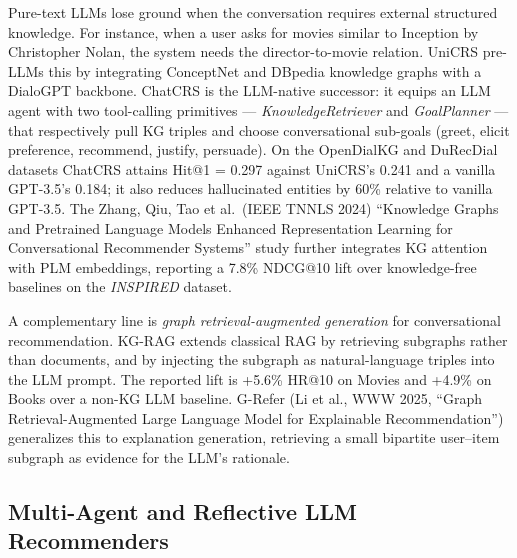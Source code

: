 \documentclass{article}
\begin{document}
Pure-text LLMs lose ground when the conversation requires external structured knowledge. For instance, when a user asks for movies similar to Inception by Christopher Nolan, the system needs the director-to-movie relation. UniCRS \citep{wang2022asurveyonthefairne} pre-LLMs this by integrating ConceptNet and DBpedia knowledge graphs with a DialoGPT backbone. ChatCRS \citep{li2025grefergraphretriev} is the LLM-native successor: it equips an LLM agent with two tool-calling primitives --- \emph{KnowledgeRetriever} and \emph{GoalPlanner} --- that respectively pull KG triples and choose conversational sub-goals (greet, elicit preference, recommend, justify, persuade). On the OpenDialKG and DuRecDial datasets ChatCRS attains Hit@1 = 0.297 against UniCRS's 0.241 and a vanilla GPT-3.5's 0.184; it also reduces hallucinated entities by 60\% relative to vanilla GPT-3.5. The Zhang, Qiu, Tao et al.~(IEEE TNNLS 2024) ``Knowledge Graphs and Pretrained Language Models Enhanced Representation Learning for Conversational Recommender Systems'' study further integrates KG attention with PLM embeddings, reporting a 7.8\% NDCG@10 lift over knowledge-free baselines on the \emph{INSPIRED} dataset.

A complementary line is \emph{graph retrieval-augmented generation} for conversational recommendation. KG-RAG \citep{wang2025knowledgegraphretr} extends classical RAG by retrieving subgraphs rather than documents, and by injecting the subgraph as natural-language triples into the LLM prompt. The reported lift is +5.6\% HR@10 on Movies and +4.9\% on Books over a non-KG LLM baseline. G-Refer (Li et al., WWW 2025, ``Graph Retrieval-Augmented Large Language Model for Explainable Recommendation'') generalizes this to explanation generation, retrieving a small bipartite user--item subgraph as evidence for the LLM's rationale.

\subsection{Multi-Agent and Reflective LLM Recommenders}\label{multi-agent-and-reflective-llm-recommenders}
\end{document}
